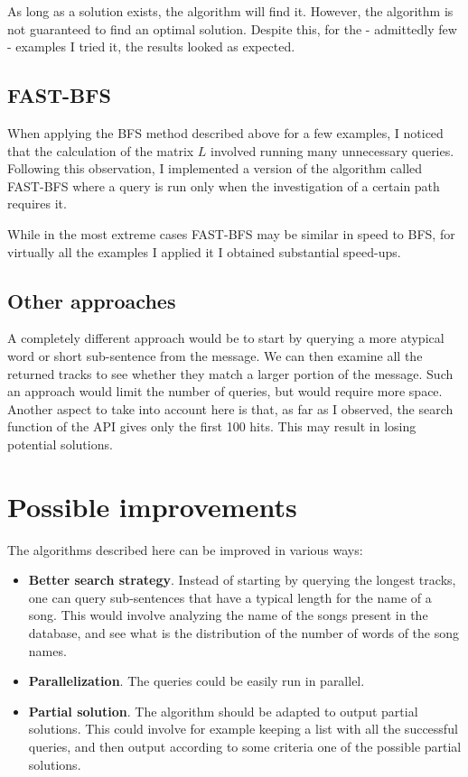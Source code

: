 \documentclass[12pt]{article}
\begin{document}
As long as a solution exists, the algorithm will find it. However, the
algorithm is not guaranteed to find an optimal solution. Despite this,
for the - admittedly few - examples I tried it, the results looked as
expected.

\subsection{FAST-BFS}
When applying the BFS method described above for a few examples, I
noticed that the calculation of the matrix $L$ involved running many
unnecessary queries. Following this observation, I implemented a
version of the algorithm called FAST-BFS where a query is run only
when the investigation of a certain path requires it.

While in the most extreme cases FAST-BFS may be similar in speed to
BFS, for virtually all the examples I applied it I obtained
substantial speed-ups.

\subsection{Other approaches}
A completely different approach would be to start by querying a more
atypical word or short sub-sentence from the message. We can then
examine all the returned tracks to see whether they match a larger
portion of the message. Such an approach would limit the number of
queries, but would require more space. Another aspect to take into
account here is that, as far as I observed, the search function of the
API gives only the first 100 hits. This may result in losing potential
solutions.

\section{Possible improvements}
The algorithms described here can be improved in various ways:
\begin{itemize}
\item {\bf Better search strategy}. Instead of starting by querying
  the longest tracks, one can query sub-sentences that have a typical
  length for the name of a song. This would involve analyzing the name
  of the songs present in the database, and see what is the
  distribution of the number of words of the song names.
\item {\bf Parallelization}. The queries could be easily run in
  parallel. 
\item {\bf Partial solution}. The algorithm should be adapted to
  output partial solutions. This could involve for example keeping a
  list with all the successful queries, and then output according to
  some criteria one of the possible partial solutions.
\end{itemize}
\end{document}
